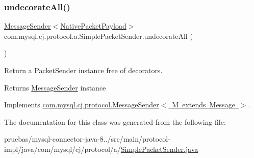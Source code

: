 \subsubsection{\texorpdfstring{undecorate\+All()}{undecorateAll()}}
{\footnotesize\ttfamily \mbox{\hyperlink{interfacecom_1_1mysql_1_1cj_1_1protocol_1_1_message_sender}{Message\+Sender}}$<$\mbox{\hyperlink{classcom_1_1mysql_1_1cj_1_1protocol_1_1a_1_1_native_packet_payload}{Native\+Packet\+Payload}}$>$ com.\+mysql.\+cj.\+protocol.\+a.\+Simple\+Packet\+Sender.\+undecorate\+All (\begin{DoxyParamCaption}{ }\end{DoxyParamCaption})}

Return a Packet\+Sender instance free of decorators.

\begin{DoxyReturn}{Returns}
\mbox{\hyperlink{interfacecom_1_1mysql_1_1cj_1_1protocol_1_1_message_sender}{Message\+Sender}} instance 
\end{DoxyReturn}


Implements \mbox{\hyperlink{interfacecom_1_1mysql_1_1cj_1_1protocol_1_1_message_sender_a8066931f03c2fa9cc705716fa10a4517}{com.\+mysql.\+cj.\+protocol.\+Message\+Sender$<$ M extends Message $>$}}.



The documentation for this class was generated from the following file\+:\begin{DoxyCompactItemize}
\item 
pruebas/mysql-\/connector-\/java-\/8../src/main/protocol-\/impl/java/com/mysql/cj/protocol/a/\mbox{\hyperlink{_simple_packet_sender_8java}{Simple\+Packet\+Sender.\+java}}\end{DoxyCompactItemize}
